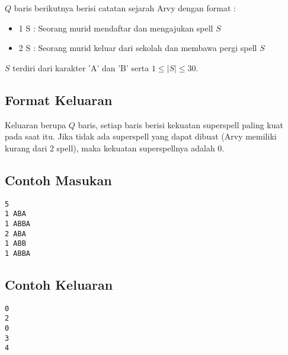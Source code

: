 \documentclass{article}
\begin{document}
$Q$ baris berikutnya berisi catatan sejarah Arvy dengan format :
\begin{itemize}
    \setlength\itemsep{0pt}
	\item1 S : Seorang murid mendaftar dan mengajukan spell $S$
	\item2 S : Seorang murid keluar dari sekolah dan membawa pergi spell $S$
\end{itemize}
$S$ terdiri dari karakter 'A' dan 'B' serta $1 \leq |S| \leq 30$.

\subsection*{Format Keluaran}
Keluaran berupa $Q$ baris, setiap baris berisi kekuatan superspell paling kuat pada saat itu. Jika tidak ada superspell yang dapat dibuat (Arvy memiliki kurang dari 2 spell), maka kekuatan superspellnya adalah 0.

\begin{multicols}{2}
\subsection*{Contoh Masukan}
\begin{lstlisting}
5
1 ABA
1 ABBA
2 ABA
1 ABB
1 ABBA

\end{lstlisting}
\columnbreak
\subsection*{Contoh Keluaran}
\begin{lstlisting}
0
2
0
3
4
\end{lstlisting}
\vfill
\null
\end{multicols}
\pagebreak
\end{document}
